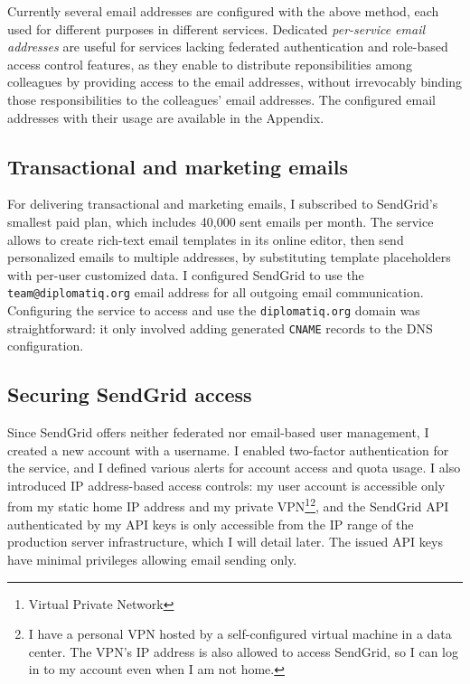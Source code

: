 Currently several email addresses are configured with the above method, each used for different purposes in different services. Dedicated \emph{per-service email addresses} are useful for services lacking federated authentication and role-based access control features, as they enable to distribute reponsibilities among colleagues by providing access to the email addresses, without irrevocably binding those responsibilities to the colleagues' email addresses. The configured email addresses with their usage are available in the Appendix.

\subsection{Transactional and marketing emails}

For delivering transactional and marketing emails, I subscribed to SendGrid's smallest paid plan, which includes 40,000 sent emails per month. The service allows to create rich-text email templates in its online editor, then send personalized emails to multiple addresses, by substituting template placeholders with per-user customized data. I configured SendGrid to use the \lstinline{team@diplomatiq.org} email address for all outgoing email communication. Configuring the service to access and use the \lstinline{diplomatiq.org} domain was straightforward: it only involved adding generated \lstinline{CNAME} records to the DNS configuration.

\subsection{Securing SendGrid access}

Since SendGrid offers neither federated nor email-based user management, I created a new account with a username. I enabled two-factor authentication for the service, and I defined various alerts for account access and quota usage. I also introduced IP address-based access controls: my user account is accessible only from my static home IP address and my private VPN\footnote{Virtual Private Network}\footnote{I have a personal VPN hosted by a self-configured virtual machine in a data center. The VPN's IP address is also allowed to access SendGrid, so I can log in to my account even when I am not home.}, and the SendGrid API authenticated by my API keys is only accessible from the IP range of the production server infrastructure, which I will detail later. The issued API keys have minimal privileges allowing email sending only.

